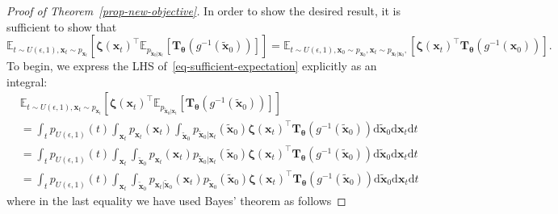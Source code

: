 \begin{proof}[Proof of Theorem~\ref{prop-new-objective}]
In order to show the desired result, it is sufficient to show that 
\begin{equation}
\label{eq-sufficient-expectation}
\mathbb{E}_{t\sim U(\epsilon, 1), \mathbf{x}_t \sim p_{\mathbf{x}_t}}\left[\boldsymbol{\zeta}(\mathbf{x}_t)^{\top}\mathbb{E}_{p_{\tilde{\mathbf{x}}_{0}\vert\mathbf{x}_t}}[\mathbf{T}_{\boldsymbol{\theta}}(g^{-1}(\tilde{\mathbf{x}}_{0}))]\right]  = \mathbb{E}_{t\sim U(\epsilon, 1),\mathbf{x}_0\sim  p_{\mathbf{x}_0}, \mathbf{x}_t \sim p_{\mathbf{x}_t|\mathbf{x}_0}, }\left[\boldsymbol{\zeta}(\mathbf{x}_t)^{\top}\mathbf{T}_{\boldsymbol{\theta}}(g^{-1}({\mathbf{x}}_{0}))\right].
\end{equation}
To begin, we express the LHS of~\eqref{eq-sufficient-expectation} explicitly as an integral:
\begin{equation}
\label{eq-explicit-integral-proof}
\begin{aligned}
&\mathbb{E}_{t\sim U(\epsilon, 1), \mathbf{x}_t \sim p_{\mathbf{x}_t}}\left[\boldsymbol{\zeta}(\mathbf{x}_t)^{\top}\mathbb{E}_{p_{\tilde{\mathbf{x}}_{0}\vert\mathbf{x}_t}}[\mathbf{T}_{\boldsymbol{\theta}}(g^{-1}(\tilde{\mathbf{x}}_{0}))]\right] \\
&=\int_{t}    p_{ U(\epsilon, 1)}(t)\int_{\mathbf{x}_t}  p_{\mathbf{x}_t}(\mathbf{x}_{t})  \int_{\tilde{\mathbf{x}}_0} p_{\tilde{\mathbf{x}}_0\vert \mathbf{x}_t}(\tilde{\mathbf{x}}_{0})\boldsymbol{\zeta}(\mathbf{x}_t)^{\top} \mathbf{T}_{\boldsymbol{\theta}}(g^{-1}(\tilde{\mathbf{x}}_{0})) \mathrm{d}\tilde{\mathbf{x}}_{0}\mathrm{d}\mathbf{x}_t\mathrm{d}t\\
&=\int_{t} p_{ U(\epsilon, 1)}(t)\int_{\mathbf{x}_t} \int_{\tilde{\mathbf{x}}_0} p_{\mathbf{x}_t}(\mathbf{x}_{t})       p_{\tilde{\mathbf{x}}_0\vert \mathbf{x}_t}(\tilde{\mathbf{x}}_{0}) \boldsymbol{\zeta}(\mathbf{x}_t)^{\top}\mathbf{T}_{\boldsymbol{\theta}}(g^{-1}(\tilde{\mathbf{x}}_{0})) \mathrm{d}\tilde{\mathbf{x}}_{0}\mathrm{d}\mathbf{x}_t\mathrm{d}t \\
&=\int_{t} p_{ U(\epsilon, 1)}(t)\int_{\mathbf{x}_t} \int_{\tilde{\mathbf{x}}_0} p_{\mathbf{x}_t|\tilde{\mathbf{x}}_{0}}(\mathbf{x}_{t}) p_{\tilde{\mathbf{x}}_{0}}(\tilde{\mathbf{x}}_{0}) \boldsymbol{\zeta}(\mathbf{x}_t)^{\top}\mathbf{T}_{\boldsymbol{\theta}}(g^{-1}(\tilde{\mathbf{x}}_{0})) \mathrm{d}\tilde{\mathbf{x}}_{0}\mathrm{d}\mathbf{x}_t\mathrm{d}t 
\end{aligned}
\end{equation}
where in the last equality we have used Bayes' theorem as follows

\end{proof}
